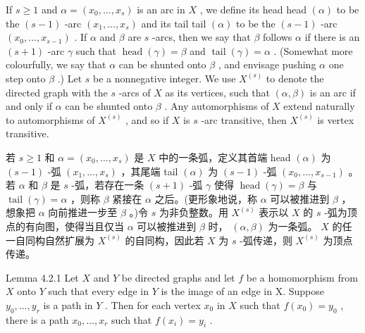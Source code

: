 \documentclass[10pt]{article}
\begin{document}
If \(s \geq  1\) and \(\alpha  = \left( {{x}_{0},\ldots ,{x}_{s}}\right)\) is an arc in \(X\) , we define its head head \(\left( \alpha \right)\) to be the \(\left( {s - 1}\right)\) -arc \(\left( {{x}_{1},\ldots ,{x}_{s}}\right)\) and its tail tail \(\left( \alpha \right)\) to be the \(\left( {s - 1}\right)\) -arc \(\left( {{x}_{0},\ldots ,{x}_{s - 1}}\right)\) . If \(\alpha\) and \(\beta\) are \(s\) -arcs, then we say that \(\beta\) follows \(\alpha\) if there is an \(\left( {s + 1}\right)\) -arc \(\gamma\) such that \(\operatorname{head}\left( \gamma \right)  = \beta\) and \(\operatorname{tail}\left( \gamma \right)  = \alpha\) . (Somewhat more colourfully, we say that \(\alpha\) can be shunted onto \(\beta\) , and envisage pushing \(\alpha\) one step onto \(\beta\) .) Let \(s\) be a nonnegative integer. We use \({X}^{\left( s\right) }\) to denote the directed graph with the \(s\) -arcs of \(X\) as its vertices, such that \(\left( {\alpha ,\beta }\right)\) is an arc if and only if \(\alpha\) can be shunted onto \(\beta\) . Any automorphisms of \(X\) extend naturally to automorphisms of \({X}^{\left( s\right) }\) , and so if \(X\) is \(s\) -arc transitive, then \({X}^{\left( s\right) }\) is vertex transitive.

\begin{tcolorbox}\relax
若 \(s \geq  1\) 和 \(\alpha  = \left( {{x}_{0},\ldots ,{x}_{s}}\right)\) 是 \(X\) 中的一条弧，定义其首端 head \(\left( \alpha \right)\) 为 \(\left( {s - 1}\right)\) -弧 \(\left( {{x}_{1},\ldots ,{x}_{s}}\right)\) ，其尾端 tail \(\left( \alpha \right)\) 为 \(\left( {s - 1}\right)\) -弧 \(\left( {{x}_{0},\ldots ,{x}_{s - 1}}\right)\) 。若 \(\alpha\) 和 \(\beta\) 是 \(s\) -弧，若存在一条 \(\left( {s + 1}\right)\) -弧 \(\gamma\) 使得 \(\operatorname{head}\left( \gamma \right)  = \beta\) 与 \(\operatorname{tail}\left( \gamma \right)  = \alpha\) ，则称 \(\beta\) 紧接在 \(\alpha\) 之后。(更形象地说，称 \(\alpha\) 可以被推进到 \(\beta\) ，想象把 \(\alpha\) 向前推进一步至 \(\beta\) 。)令 \(s\) 为非负整数。用 \({X}^{\left( s\right) }\) 表示以 \(X\) 的 \(s\) -弧为顶点的有向图，使得当且仅当 \(\alpha\) 可以被推进到 \(\beta\) 时， \(\left( {\alpha ,\beta }\right)\) 为一条弧。 \(X\) 的任一自同构自然扩展为 \({X}^{\left( s\right) }\) 的自同构，因此若 \(X\) 为 \(s\) -弧传递，则 \({X}^{\left( s\right) }\) 为顶点传递。
\end{tcolorbox}

Lemma 4.2.1 Let \(X\) and \(Y\) be directed graphs and let \(f\) be a homomorphism from \(X\) onto \(Y\) such that every edge in \(Y\) is the image of an edge in X. Suppose \({y}_{0},\ldots ,{y}_{r}\) is a path in \(Y\) . Then for each vertex \({x}_{0}\) in \(X\) such that \(f\left( {x}_{0}\right)  = {y}_{0}\) , there is a path \({x}_{0},\ldots ,{x}_{r}\) such that \(f\left( {x}_{i}\right)  = {y}_{i}\) .
\end{document}
